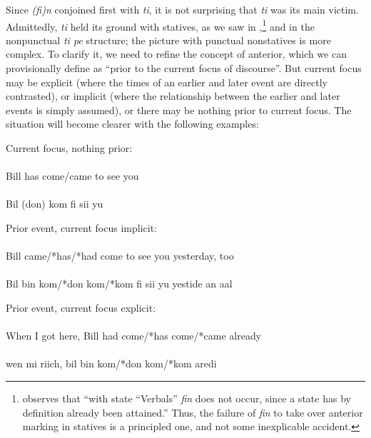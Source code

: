 Since \textit{(fi)n} conjoined first with \textit{ti}, it is not surprising that \textit{ti} was its main victim. Admittedly, \textit{ti} held its ground with statives, as we saw in ,\footnote{\citet{Corne1981} observes that ``with state ``Verbals'' \textit{fin} does not occur, since a state has by definition already been attained.'' Thus, the failure of \textit{fin} to take over anterior marking in statives is a principled one, and not some inexplicable accident.} and in the nonpunctual \textit{ti pe} structure; the picture with punctual nonstatives is more complex. To clarify it, we need to refine the concept of anterior, which we can provisionally define as ``prior to the current focus of discourse''. But current focus may be explicit (where the times of an earlier and later event are directly contrasted), or implicit (where the relationship between the earlier and later events is simply assumed), or there may be nothing prior to current focus. The situation will become clearer with the following examples:


\ea\label{ex:2:103}
{Current focus, nothing prior:}\\
\ea 
\ili{\langEng}{}{}\\
Bill has come/came to see you\\
\ex 
\ili{\langGC}{}{}\\
Bil (don) kom fi sii yu\\
\z
\z

\ea\label{ex:2:104}
{Prior event, current focus implicit:}{}\\
\ea 
\ili{\langEng}{}{}\\
Bill came/*has/*had come to see you yesterday, too\\
\ex 
\ili{\langGC}{}{}\\ 
Bil bin kom/*don kom/*kom fi sii yu yestide an aal\\
\z
\z


\ea\label{ex:2:105}
{Prior event, current focus explicit:}{}\\
\ea 
\ili{\langEng}{}{}\\
When I got here, Bill had come/*has come/*came already\\
\ex 
\ili{\langGC}{}{}\\
 wen mi riich, bil bin kom/*don kom/*kom aredi\\
\z
\z


